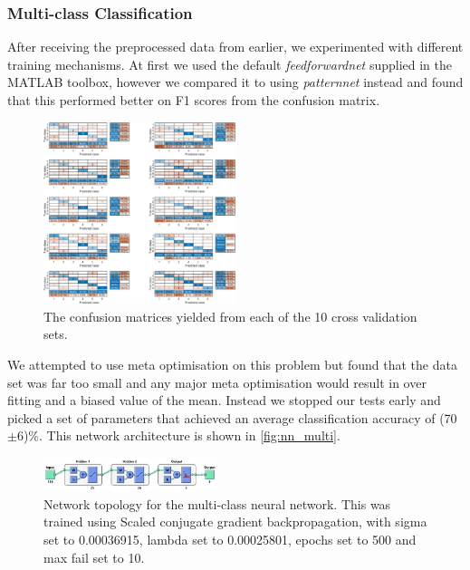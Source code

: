 \documentclass[%
 reprint,
 amsmath,amssymb,
 aps,
]{revtex4-1}
\begin{document}
\subsubsection{Multi-class Classification}



\par{After receiving the preprocessed data from earlier, we experimented with different training mechanisms. At first we used the default \textit{feedforwardnet} supplied in the MATLAB toolbox\cite{dltoolbox}, however we compared it to using \textit{patternnet} instead and found that this performed better on F1 scores from the confusion matrix.}


\begin{figure}
    \centering
    \includegraphics[width=0.5\textwidth,height=0.8\textwidth]{multicrossvalidationconfusionmatrices.eps}
    \caption{The confusion matrices yielded from each of the 10 cross validation sets.}
    \label{fig:nn_multi_results}
\end{figure}
\par{We attempted to use meta optimisation on this problem but found that the data set was far too small and any major meta optimisation would result in over fitting and a biased value of the mean. Instead we stopped our tests early and picked a set of parameters that achieved an average classification accuracy of (70$\pm$6)\%. This network architecture is shown in \autoref{fig:nn_multi}.}

\begin{figure}
    \centering
    \includegraphics[width=0.45\textwidth]{multitopology1.png}
    \caption{Network topology for the multi-class neural network. This was trained using Scaled conjugate gradient backpropagation\cite{trainscg}, with sigma set to 0.00036915, lambda set to 0.00025801, epochs set to 500 and max fail set to 10.}
    \label{fig:nn_multi}
\end{figure}
\end{document}
